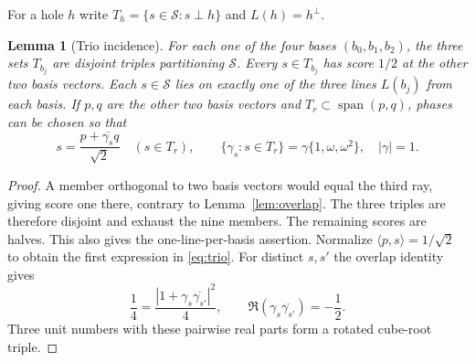 \documentclass[11pt,a4paper]{article}
\newtheorem{lemma}[theorem]{Lemma}
\theoremstyle{remark}
\numberwithin{equation}{section}
\newcommand{\ip}[2]{\langle #1,#2\rangle}
\begin{document}
For a hole $h$ write $T_h=\{s\in\mathcal S:s\perp h\}$ and $L(h)=h^\perp$.
\begin{lemma}[Trio incidence]\label{lem:trios}
For each one of the four bases $(b_0,b_1,b_2)$, the three sets $T_{b_j}$ are disjoint triples partitioning $\mathcal S$. Every $s\in T_{b_j}$ has score $1/2$ at the other two basis vectors. Each $s\in\mathcal S$ lies on exactly one of the three lines $L(b_j)$ from each basis. If $p,q$ are the other two basis vectors and $T_r\subset\operatorname{span}(p,q)$, phases can be chosen so that
\begin{equation}\label{eq:trio}
 s=\frac{p+\overline{\gamma_s}q}{\sqrt2}\quad(s\in T_r),
 \qquad \{\gamma_s:s\in T_r\}=\gamma\{1,\omega,\omega^2\},\quad |\gamma|=1.
\end{equation}
\end{lemma}
\begin{proof}
A member orthogonal to two basis vectors would equal the third ray, giving score one there, contrary to Lemma~\ref{lem:overlap}. The three triples are therefore disjoint and exhaust the nine members. The remaining scores are halves. This also gives the one-line-per-basis assertion. Normalize $\ip ps=1/\sqrt2$ to obtain the first expression in \eqref{eq:trio}. For distinct $s,s'$ the overlap identity gives
\[
 \frac14=\frac{|1+\gamma_s\overline{\gamma_{s'}}|^2}{4},
 \qquad \Re(\gamma_s\overline{\gamma_{s'}})=-\frac12.
\]
Three unit numbers with these pairwise real parts form a rotated cube-root triple.
\end{proof}
\end{document}
